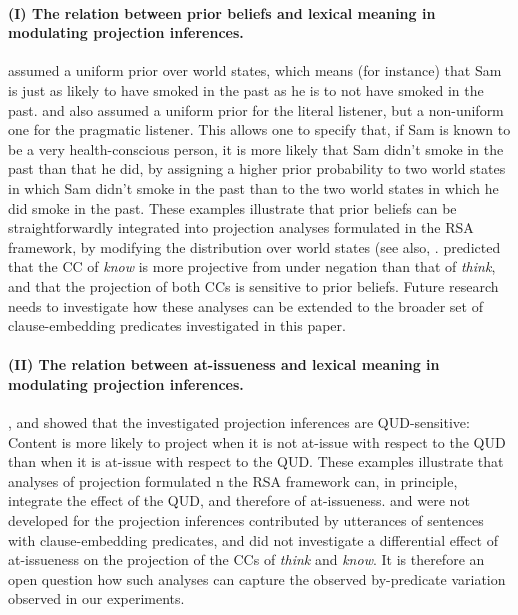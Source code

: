 \documentclass[11pt,fleqn]{article}
\newcommand{\6}{\mbox{$[\hspace*{-.6mm}[$}}
\newcommand{\9}{\mbox{$]\hspace*{-.6mm}]$}}
\begin{document}
\paragraph{(I) The relation between prior beliefs and lexical meaning in modulating projection inferences.} \cite{qing-etal2016} assumed a uniform prior over world states, which means (for instance) that Sam is just as likely to have smoked in the past as he is to not have smoked in the past. \cite{warstadt2022} and \citealt{scontras-tonhauser2025} also assumed a uniform prior for the literal listener, but a non-uniform one for the pragmatic listener. This allows one to specify that, if Sam is known to be a very health-conscious person, it is more likely that Sam didn't smoke in the past than that he did, by assigning a higher prior probability to two world states in which Sam didn't smoke in the past than to the two world states in which he did  smoke in the past. These examples illustrate that prior beliefs can be straightforwardly integrated into projection analyses formulated in the RSA framework, by modifying the distribution over world states (see also, \citep[e.g.,][]{goodman-stuhlmueller2013,degen2023-RSA}. \cite{scontras-tonhauser2025} predicted that the CC of \emph{know} is more projective from under negation than that of \emph{think}, and that the projection of both CCs is sensitive to prior beliefs. Future research needs to investigate how these analyses can be extended to the broader set of clause-embedding predicates investigated in this paper. 

\paragraph{(II) The relation between at-issueness and lexical meaning in modulating projection inferences.} \cite{qing-etal2016}, \cite{warstadt2022} and \cite{scontras-tonhauser2025} showed that the investigated projection inferences are QUD-sensitive: Content is more likely to project when it is not at-issue with respect to the QUD than when it is at-issue with respect to the QUD. These examples illustrate that analyses of projection formulated n the RSA framework can, in principle, integrate the effect of the QUD, and therefore of at-issueness. \cite{qing-etal2016} and \cite{warstadt2022} were not developed for the projection inferences contributed by utterances of sentences with clause-embedding predicates, and \cite{scontras-tonhauser2025} did not investigate a differential effect of at-issueness on the projection of the CCs of \emph{think} and \emph{know}. It is therefore an open question how such analyses can capture the observed by-predicate variation observed in our experiments. 
\end{document}
